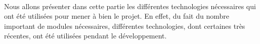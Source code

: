 \paragraph{}
Nous allons présenter dans cette partie les différentes technologies nécessaires qui ont été utilisées pour mener à bien le projet. En effet, du fait du nombre important de modules nécessaires, différentes technologies, dont certaines très récentes, ont été utilisées pendant le développement.